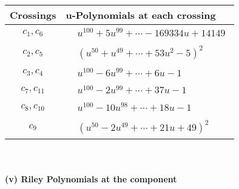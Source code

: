 \documentclass[1p]{elsarticle_modified}
\theoremstyle{definition}
\begin{document}
\begin{tabular}{m{50pt}|m{274pt}}
Crossings & \hspace{64pt}u-Polynomials at each crossing \\
\hline $$\begin{aligned}c_{1},c_{6}\end{aligned}$$&$\begin{aligned}
&u^{100}+5 u^{99}+\cdots-169334 u+14149
\end{aligned}$\\
\hline $$\begin{aligned}c_{2},c_{5}\end{aligned}$$&$\begin{aligned}
&(u^{50}+u^{49}+\cdots+53 u^2-5)^{2}
\end{aligned}$\\
\hline $$\begin{aligned}c_{3},c_{4}\end{aligned}$$&$\begin{aligned}
&u^{100}-6 u^{99}+\cdots+6 u-1
\end{aligned}$\\
\hline $$\begin{aligned}c_{7},c_{11}\end{aligned}$$&$\begin{aligned}
&u^{100}-2 u^{99}+\cdots+37 u-1
\end{aligned}$\\
\hline $$\begin{aligned}c_{8},c_{10}\end{aligned}$$&$\begin{aligned}
&u^{100}-10 u^{98}+\cdots+18 u-1
\end{aligned}$\\
\hline $$\begin{aligned}c_{9}\end{aligned}$$&$\begin{aligned}
&(u^{50}-2 u^{49}+\cdots+21 u+49)^{2}
\end{aligned}$\\
\hline
\end{tabular}\\~\\
\newpage\renewcommand{\arraystretch}{1}
\flushleft \textbf{(v) Riley Polynomials at the component}\newline \\
\end{document}
